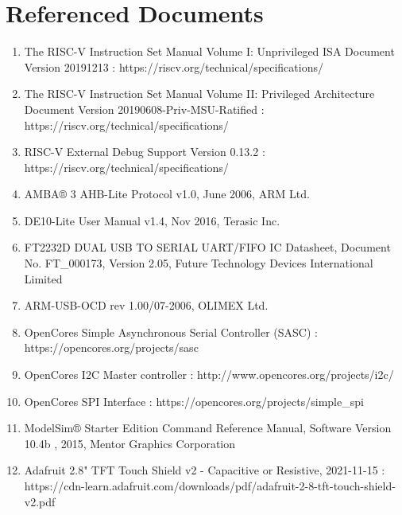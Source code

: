 \section{Referenced Documents}
\begin{enumerate}[\lbrack 1\rbrack]
\item The RISC-V Instruction Set Manual Volume I: Unprivileged ISA Document Version 20191213 :
https://riscv.org/technical/specifications/
\item The RISC-V Instruction Set Manual Volume II: Privileged Architecture Document Version 20190608-Priv-MSU-Ratified : https://riscv.org/technical/specifications/

\item RISC-V External Debug Support Version 0.13.2 : https://riscv.org/technical/specifications/

\item AMBA® 3 AHB-Lite Protocol v1.0, June 2006, ARM Ltd.

\item DE10-Lite User Manual v1.4, Nov 2016, Terasic Inc.

\item FT2232D DUAL USB TO SERIAL UART/FIFO IC Datasheet, Document No. FT\_000173, Version 2.05, Future Technology Devices International Limited

\item ARM-USB-OCD rev 1.00/07-2006, OLIMEX Ltd.

\item OpenCores Simple Asynchronous Serial Controller (SASC) : https://opencores.org/projects/sasc

\item OpenCores I2C Master controller : http://www.opencores.org/projects/i2c/

\item OpenCores SPI Interface : https://opencores.org/projects/simple\_spi

\item ModelSim® Starter Edition Command Reference Manual, Software Version 10.4b , 2015, Mentor Graphics Corporation

\item Adafruit 2.8" TFT Touch Shield v2 - Capacitive or Resistive, 2021-11-15 :
https://cdn-learn.adafruit.com/downloads/pdf/adafruit-2-8-tft-touch-shield-v2.pdf

\end{enumerate}



